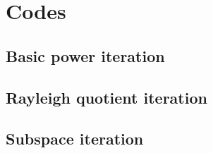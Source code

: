 \documentclass[12pt, leqno]{article} %
\begin{document}






\section{Codes}
\subsection{Basic power iteration}


\subsection{Rayleigh quotient iteration}


\subsection{Subspace iteration}

\end{document}
